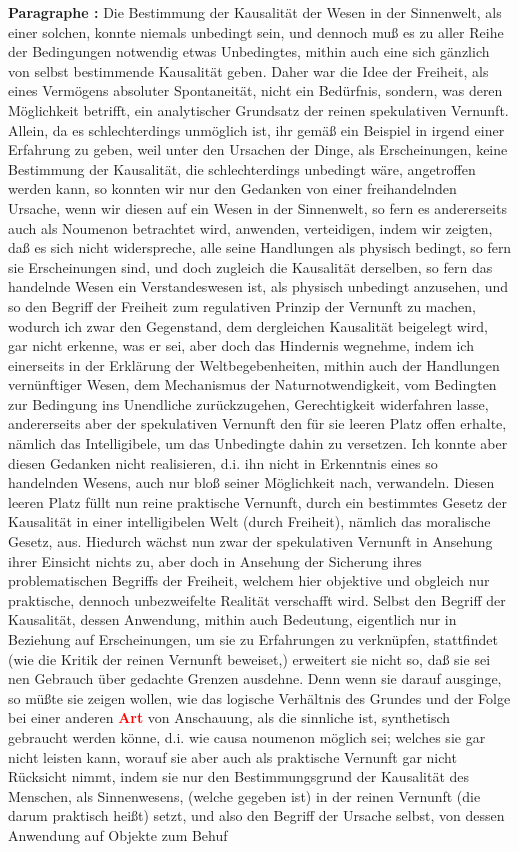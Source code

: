 \documentclass[a4paper,12pt,twoside]{book}
\newcommand{\match}[1]{\textcolor{red}{\textbf{#1}}}
\begin{document}
	\noindent\textbf{Paragraphe : }
	Die Bestimmung der Kausalität der Wesen in der Sinnenwelt, als einer solchen, konnte niemals unbedingt sein, und dennoch muß es zu aller Reihe der Bedingungen notwendig etwas Unbedingtes, mithin auch eine sich gänzlich von selbst bestimmende Kausalität geben. Daher war die Idee der Freiheit, als eines Vermögens absoluter Spontaneität, nicht ein Bedürfnis, sondern, was deren Möglichkeit betrifft, ein analytischer Grundsatz der reinen spekulativen Vernunft. Allein, da es schlechterdings unmöglich ist, ihr gemäß ein Beispiel in irgend einer Erfahrung zu geben, weil unter den Ursachen der Dinge, als Erscheinungen, keine Bestimmung der Kausalität, die schlechterdings unbedingt wäre, angetroffen werden kann, so konnten wir nur den Gedanken von einer freihandelnden Ursache, wenn wir diesen auf ein Wesen in der Sinnenwelt, so fern es andererseits auch als Noumenon betrachtet wird, anwenden, verteidigen, indem wir zeigten, daß es sich nicht widerspreche, alle seine Handlungen als physisch bedingt, so fern sie Erscheinungen sind, und doch zugleich die Kausalität derselben, so fern das handelnde Wesen ein Verstandeswesen ist, als physisch unbedingt anzusehen, und so den Begriff der Freiheit zum regulativen Prinzip der Vernunft zu machen, wodurch ich zwar den Gegenstand, dem dergleichen Kausalität beigelegt wird, gar nicht erkenne, was er sei, aber doch das Hindernis wegnehme, indem ich einerseits in der Erklärung der Weltbegebenheiten, mithin auch der Handlungen vernünftiger Wesen, dem Mechanismus der Naturnotwendigkeit, vom Bedingten zur Bedingung ins Unendliche zurückzugehen, Gerechtigkeit widerfahren lasse, andererseits aber der spekulativen Vernunft den für sie leeren Platz offen erhalte, nämlich das Intelligibele, um das Unbedingte dahin zu versetzen. Ich konnte aber diesen Gedanken nicht realisieren, d.i. ihn nicht in Erkenntnis eines so handelnden Wesens, auch nur bloß seiner Möglichkeit nach, verwandeln. Diesen leeren Platz füllt nun reine praktische Vernunft, durch ein bestimmtes Gesetz der Kausalität in einer intelligibelen Welt (durch Freiheit), nämlich das moralische Gesetz, aus. Hiedurch wächst nun zwar der  spekulativen Vernunft in Ansehung ihrer Einsicht nichts zu, aber doch in Ansehung der Sicherung ihres problematischen Begriffs der Freiheit, welchem hier objektive und obgleich nur praktische, dennoch unbezweifelte Realität verschafft wird. Selbst den Begriff der Kausalität, dessen Anwendung, mithin auch Bedeutung, eigentlich nur in Beziehung auf Erscheinungen, um sie zu Erfahrungen zu verknüpfen, stattfindet (wie die Kritik der reinen Vernunft beweiset,) erweitert sie nicht so, daß sie sei nen Gebrauch über gedachte Grenzen ausdehne. Denn wenn sie darauf ausginge, so müßte sie zeigen wollen, wie das logische Verhältnis des Grundes und der Folge bei einer anderen \match{Art} von Anschauung, als die sinnliche ist, synthetisch gebraucht werden könne, d.i. wie causa noumenon möglich sei; welches sie gar nicht leisten kann, worauf sie aber auch als praktische Vernunft gar nicht Rücksicht nimmt, indem sie nur den Bestimmungsgrund der Kausalität des Menschen, als Sinnenwesens, (welche gegeben ist) in der reinen Vernunft (die darum praktisch heißt) setzt, und also den Begriff der Ursache selbst, von dessen Anwendung auf Objekte zum Behuf 
\end{document}
